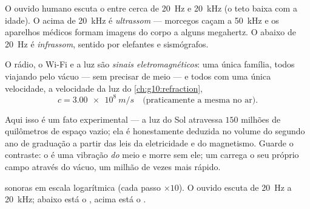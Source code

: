 \begin{definition}\label{def:g10:signals-and-waves:ultrasound}
O ouvido humano escuta o  entre cerca de \qty{20}{Hz} e \qty{20}{kHz}
(o teto baixa com a idade). O  acima de \qty{20}{kHz} é
\emph{ultrassom} --- morcegos caçam a \qty{50}{kHz} e os
aparelhos médicos formam imagens do corpo a alguns megahertz. O 
abaixo de \qty{20}{Hz} é \emph{infrassom}, sentido por
elefantes e sismógrafos.
\end{definition}

\begin{proposition}\label{prop:g10:signals-and-waves:em}
O rádio, o Wi-Fi e a luz são \emph{sinais
eletromagnéticos}: uma única família, todos
viajando pelo vácuo --- sem precisar de meio --- e todos com uma única
velocidade, a velocidade da luz do \cref{ch:g10:refraction},
\[
c = \qty{3.00e8}{m/s} \quad \text{(praticamente a mesma no ar).}
\]
\end{proposition}
\admitted

\begin{remark}\label{rem:g10:signals-and-waves:honest}
Aqui isso é um fato experimental --- a luz do Sol atravessa $150$ milhões
de quilômetros de espaço vazio; ela é honestamente deduzida no volume do
segundo ano de graduação a partir das leis da eletricidade e do
magnetismo. Guarde o contraste: o  é uma vibração \emph{do} meio e
morre sem ele; um  carrega o seu próprio campo
através do vácuo, um milhão de vezes mais rápido.
\end{remark}

\begin{omfigure}

{\small {} sonoras em escala logarítmica (cada passo
$\times 10$). O ouvido escuta de \qty{20}{Hz} a \qty{20}{kHz}; abaixo
está o , acima está o .}
\end{omfigure}

